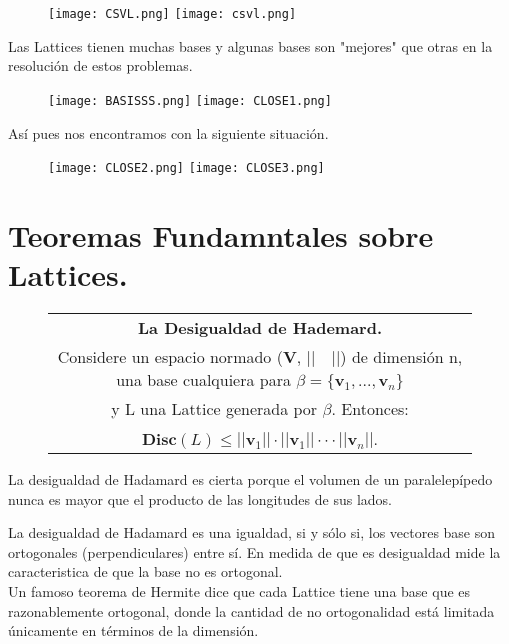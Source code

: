 \documentclass[11pt]{article}
\begin{document}
\begin{abstact}
\begin{figure}[h]
\centering
\texttt{[image: CSVL.png]}
\texttt{[image: csvl.png]}
\end{figure}

Las Lattices tienen muchas bases y algunas bases son "mejores" que otras en la resolución de estos problemas.
\begin{figure}[h]
\centering
\texttt{[image: BASISSS.png]}
\texttt{[image: CLOSE1.png]}
\end{figure}
\pagebreak 

Así pues nos encontramos con la siguiente situación. 

\begin{figure}[h]
\centering
\texttt{[image: CLOSE2.png]}
\texttt{[image: CLOSE3.png]}
\end{figure}

\section{Teoremas Fundamntales sobre Lattices.}

\begin{figure}[h]
\centering
\begin{tabular}{|| c ||}
\hline
\hline
  
\textbf{La Desigualdad de Hademard.}\\
Considere un espacio normado (\textbf{V}, $|| \quad||$) de dimensión n, una base cualquiera para $\beta = \{ \mathbf{{v}}_{1},..., \mathbf{{v}}_{n}\}$\\
y L una Lattice generada por $\beta$. Entonces: \\
\\
$\mathbf{Disc}(L) \leq ||\mathbf{v}_{1}|| \cdot ||\mathbf{v}_{1}|| \cdot \cdot \cdot ||\mathbf{v}_{n}||.$\\ 
\hline
\hline
\end{tabular}
\end{figure}

La desigualdad de Hadamard es cierta porque el volumen de un paralelepípedo nunca es mayor que el producto de las longitudes de sus lados.

La desigualdad de Hadamard es una igualdad, si y sólo si, los vectores base son ortogonales (perpendiculares) entre sí. En medida de que es desigualdad mide la caracteristica de que la base no es ortogonal. \\ 

Un famoso teorema de Hermite dice que cada Lattice tiene una base que es razonablemente ortogonal, donde la cantidad de no ortogonalidad está limitada únicamente en términos de la dimensión.


\end{abstact}
\end{document}
